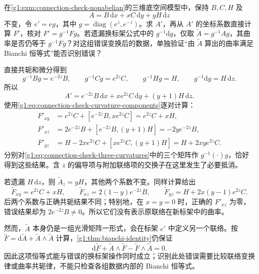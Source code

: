 \begin{exercise}\label{g1:ex:connection-check-gauge-three-dimensional}
	在\cref{g1:exm:connection-check-nonabelian}的三维底空间模型中，保持 \(B,C,H\) 及
	\[
		A=B\,\mathrm{d}x+xC\,\mathrm{d}y+yH\,\mathrm{d}z
	\]
	不变，令 \(e'=eg\)，其中 \(g=\operatorname{diag}(e^z,e^{-z})\)。求 \(A'\)，再从 \(A'\) 的坐标系数直接计算 \(F'\)，核对 \(F'=g^{-1}Fg\)。若遗漏换标架公式中的 \(g^{-1}\mathrm{d}g\)，仅取 \(\widetilde A=g^{-1}Ag\)，其曲率是否仍等于 \(g^{-1}Fg\)？对这组错误变换后的数据，单独验证“由 \(\widetilde A\) 算出的曲率满足 Bianchi 恒等式”能否识别错误？
\end{exercise}
\begin{solution}
	直接共轭和微分得到
	\[
		g^{-1}Bg=e^{-2z}B,\qquad
		g^{-1}Cg=e^{2z}C,\qquad
		g^{-1}Hg=H,\qquad
		g^{-1}\mathrm{d}g=H\,\mathrm{d}z.
	\]
	所以
	\[
		A'=e^{-2z}B\,\mathrm{d}x+xe^{2z}C\,\mathrm{d}y+(y+1)H\,\mathrm{d}z.
	\]
	使用\eqref{g1:eq:connection-check-curvature-components}逐对计算：
	\[
		\begin{aligned}
			F'_{xy}
			&=e^{2z}C+[e^{-2z}B,xe^{2z}C]=e^{2z}C+xH,\\
			F'_{xz}
			&=2e^{-2z}B+[e^{-2z}B,(y+1)H]
			=-2ye^{-2z}B,\\
			F'_{yz}
			&=H-2xe^{2z}C+[xe^{2z}C,(y+1)H]
			=H+2xye^{2z}C.
		\end{aligned}
	\]
	分别对\eqref{g1:eq:connection-check-three-curvatures}中的三个矩阵作 \(g^{-1}(\cdot)g\)，恰好得到这些结果。含 \(z\) 的偏导项与附加联络项的交换子在这里发生了必要抵消。

	若遗漏 \(H\,\mathrm{d}z\)，则 \(\widetilde A_z=yH\)，其他两个系数不变。同样计算给出
	\[
		\widetilde F_{xy}=e^{2z}C+xH,\qquad
		\widetilde F_{xz}=2(1-y)e^{-2z}B,\qquad
		\widetilde F_{yz}=H+2x(y-1)e^{2z}C.
	\]
	后两个系数与正确共轭结果不同；特别地，在 \(x=y=0\) 时，正确的 \(F'_{xz}\) 为零，错误结果却为 \(2e^{-2z}B\ne0\)。所以它们没有表示原联络在新标架中的曲率。

	然而，\(\widetilde A\) 本身仍是一组光滑矩阵一形式，会在标架 \(e'\) 中定义另一个联络。按 \(\widetilde F=\mathrm{d}\widetilde A+\widetilde A\wedge\widetilde A\) 计算，\cref{g1:thm:bianchi-identity}仍保证
	\[
		\mathrm{d}\widetilde F+\widetilde A\wedge\widetilde F-\widetilde F\wedge\widetilde A=0.
	\]
	因此这项恒等式能与错误的换标架操作同时成立；识别此处错误需要比较联络变换律或曲率共轭律，不能只检查各组数据内部的 Bianchi 恒等式。
\end{solution}

